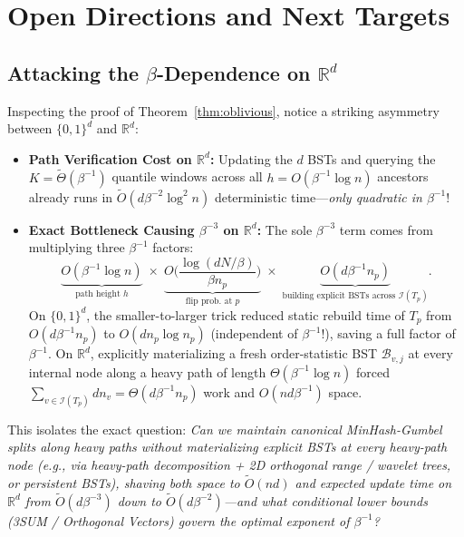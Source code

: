 \documentclass[11pt]{article}
\theoremstyle{definition}
\newcommand{\R}{\mathbb{R}}
\newcommand{\calB}{\mathcal{B}}
\newcommand{\calI}{\mathcal{I}}
\begin{document}
\section{Open Directions and Next Targets}

\subsection{Attacking the \texorpdfstring{$\beta$}{beta}-Dependence on \texorpdfstring{$\R^d$}{R\^{}d}}

Inspecting the proof of Theorem~\ref{thm:oblivious}, notice a striking asymmetry between $\{0,1\}^d$ and $\R^d$:
\begin{itemize}[leftmargin=1.5em,itemsep=2pt]
    \item \textbf{Path Verification Cost on $\R^d$:} Updating the $d$ BSTs and querying the $K = \tilde{\Theta}(\beta^{-1})$ quantile windows across all $h = O(\beta^{-1}\log n)$ ancestors already runs in $\tilde{O}(d \beta^{-2} \log^2 n)$ deterministic time---\emph{only quadratic in $\beta^{-1}$}!
    \item \textbf{Exact Bottleneck Causing $\beta^{-3}$ on $\R^d$:} The sole $\beta^{-3}$ term comes from multiplying three $\beta^{-1}$ factors:
    \[
        \underbrace{O(\beta^{-1}\log n)}_{\text{path height } h} \;\times\; \underbrace{O\Big(\frac{\log(dN/\beta)}{\beta n_p}\Big)}_{\text{flip prob.\ at } p} \;\times\; \underbrace{O(d \beta^{-1} n_p)}_{\text{building explicit BSTs across } \calI(T_p)}.
    \]
    On $\{0,1\}^d$, the smaller-to-larger trick reduced static rebuild time of $T_p$ from $O(d \beta^{-1} n_p)$ to $O(d n_p \log n_p)$ (independent of $\beta^{-1}$!), saving a full factor of $\beta^{-1}$. On $\R^d$, explicitly materializing a fresh order-statistic BST $\calB_{v, j}$ at every internal node along a heavy path of length $\Theta(\beta^{-1}\log n)$ forced $\sum_{v \in \calI(T_p)} d n_v = \Theta(d \beta^{-1} n_p)$ work and $O(nd\beta^{-1})$ space.
\end{itemize}

This isolates the exact question: \emph{Can we maintain canonical MinHash-Gumbel splits along heavy paths without materializing explicit BSTs at every heavy-path node (e.g., via heavy-path decomposition + 2D orthogonal range / wavelet trees, or persistent BSTs), shaving both space to $\tilde{O}(nd)$ and expected update time on $\R^d$ from $\tilde{O}(d\beta^{-3})$ down to $\tilde{O}(d\beta^{-2})$---and what conditional lower bounds (3SUM / Orthogonal Vectors) govern the optimal exponent of $\beta^{-1}$?}
\end{document}
